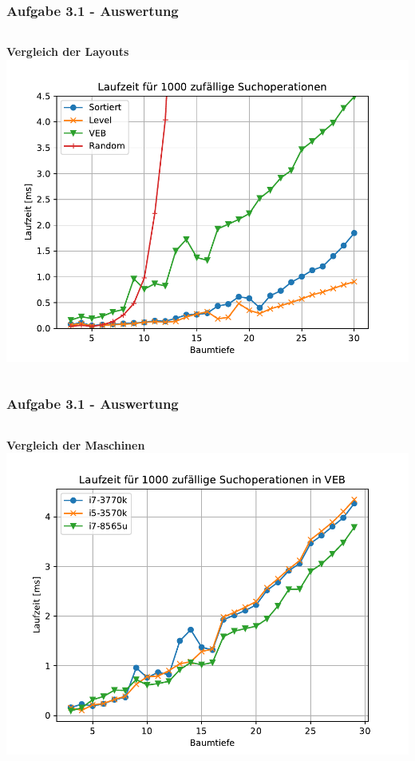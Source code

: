 \documentclass[aspectratio=169]{beamer}
\begin{document}
\begin{frame}
	\frametitle{Aufgabe 3.1 - Auswertung}
	\begin{columns}[c] %
		
		\textbf{Vergleich der Layouts}
		\includegraphics[scale=.6]{Figure_2.pdf}
		
		
	\end{columns}
	\end{frame}
	

\begin{frame}
	\frametitle{Aufgabe 3.1 - Auswertung}
	\begin{columns}[c] %
		
		\textbf{Vergleich der Maschinen}
		\includegraphics[scale=.6]{cpu_comp.pdf}
		
		
	\end{columns}
	\end{frame}
	
\end{document}

